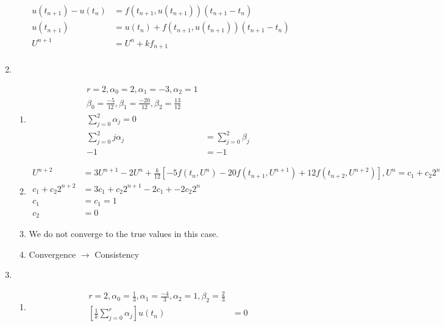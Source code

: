 \documentclass{article}
\begin{document}
\begin{enumerate}
\begin{equation*}
\begin{split}
	u(t_{n+1})  - u(t_{n}) & = f(t_{n+1},u(t_{n+1}))(t_{n+1}-t_{n}) \\
	u(t_{n+1})  & =u(t_{n})+ f(t_{n+1},u(t_{n+1}))(t_{n+1}-t_{n}) \\
	U^{n+1} & = U^{n} + k f_{n+1} \\
	\end{split}
	\end{equation*}
\item
	\begin{enumerate}
	\item
		\begin{equation*}
		\begin{split}
		r=2, \alpha_{0} = 2, \alpha_{1} = -3, \alpha_{2} = 1 \\
		\beta_{0} = \frac{-5}{12}, \beta_{1} = \frac{-20}{12}, \beta_{2} = \frac{13}{12} \\
		\sum_{j=0}^{2}\alpha_{j} = 0\\
		\sum_{j=0}^{2} j \alpha_{j} & = \sum_{j=0}^{2} \beta_{j}\\
		-1 & = -1
		\end{split}
		\end{equation*}
	\item
		\begin{equation*}
		\begin{split}
		U^{n+2} &= 3U^{n+1} - 2 U^{n} + \frac{k}{12}[-5f(t_{n}, U^{n}) -20f(t_{n+1}, U^{n+1}) + 12f(t_{n+2}, U^{n+2})], U^{n} = c_{1} + c_{2}2^{n} \\
		c_{1} + c_{2}2^{n+2} & = 3c_{1} + c_{2}2^{n+1} - 2c_{1} + -2c_{2}2^{n}  \\
		c_{1} & = c_{1} = 1  \\
		c_{2} & = 0
		\end{split}
		\end{equation*}
	\item
	We do not converge to the true values in this case. 
	\item
	Convergence $\rightarrow$ Consistency
	\end{enumerate}
\item
	\begin{enumerate}
	\item
		\begin{equation*}
		\begin{split}
		r=2, \alpha_{0} = \frac{1}{3}, \alpha_{1} = \frac{-4}{3}, \alpha_{2} = 1 , \beta_{2} = \frac{2}{3} \\
		[\frac{1}{k} \sum_{j=0}^{r} \alpha_{j}] u(t_{n}) & = 0 \\

\end{split}
\end{equation*}
\end{enumerate}
\end{enumerate}
\end{document}
